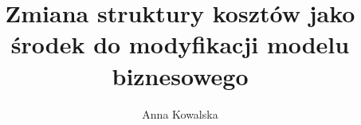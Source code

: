 
\usepackage{stronaTytulowa/uepTitle}

\title{Zmiana struktury kosztów jako środek do modyfikacji modelu biznesowego}



\author{Anna Kowalska}



